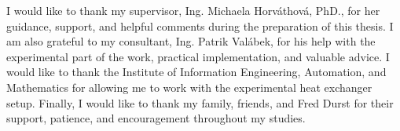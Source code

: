 I would like to thank my supervisor, Ing. Michaela Horváthová, PhD., for her guidance, support, and helpful comments during the preparation of this thesis.
I am also grateful to my consultant, Ing. Patrik Valábek, for his help with the experimental part of the work, practical implementation, and valuable advice.
I would like to thank the Institute of Information Engineering, Automation, and Mathematics for allowing me to work with the experimental heat exchanger setup.
Finally, I would like to thank my family, friends, and Fred Durst for their support, patience, and encouragement throughout my studies.